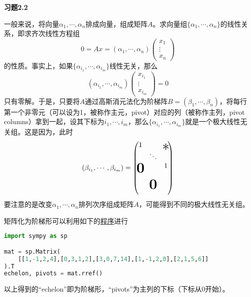 \renewcommand{\newpageorvspace}{\vspace{2em}}

\date{第三次作业}



\maketitle

{\bf 习题2.2}

一般来说，将向量$\alpha_1,\cdots,\alpha_n$排成向量，组成矩阵$A$。求向量组$\{\alpha_1,\cdots,\alpha_n\}$的线性关系，即求齐次线性方程组
$$0 = Ax = (\alpha_1,\cdots,\alpha_n) \begin{pmatrix} x_{1} \\ \vdots \\ x_{n} \end{pmatrix}$$
的性质。事实上，如果$\{\alpha_{i_1},\cdots,\alpha_{i_m}\}$线性无关，那么
$$(\alpha_{i_1},\cdots,\alpha_{i_m}) \begin{pmatrix} x_{i_1} \\ \vdots \\ x_{i_m} \end{pmatrix} = 0$$
只有零解。于是，只要将$A$通过高斯消元法化为阶梯阵$B = (\beta_1,\cdots,\beta_n)$，将每行第一个非零元（可以设为1，被称作主元，pivot）对应的列（被称作主列，pivot columns）拿到一起，设其下标为$i_1,\cdots,i_m$，那么$\{\alpha_{i_1},\cdots,\alpha_{i_m}\}$就是一个极大线性无关组。这是因为，此时
$$(\beta_{i_1},\cdots,\beta_{i_m}) = \begin{pmatrix} 1 & & \makebox(0,0){\text{\huge $\ast$}} \\ & \ddots & \\ \makebox(0,0){\text{\huge\bf 0}} & & 1 \\ & & \\ & \makebox(0,0){\text{\huge\bf 0}} & \\ & & \end{pmatrix}$$
要注意的是改变$\alpha_1,\cdots,\alpha_n$排列次序组成矩阵$A$，可能得到不同的极大线性无关组。

矩阵化为阶梯形可以利用如下的\href{https://github.com/wenh06/buaa-advanced-algebra-2021/blob/master/notebooks/assignment-3.ipynb}{程序}进行
\begin{center}
\begin{lstlisting}[language=Python]
import sympy as sp

mat = sp.Matrix(
    [[1,-1,2,4],[0,3,1,2],[3,0,7,14],[1,-1,2,0],[2,1,5,6]]
).T
echelon, pivots = mat.rref()
\end{lstlisting}
\end{center}
以上得到的``echelon''即为阶梯形，``pivots''为主列的下标（下标从0开始）。

